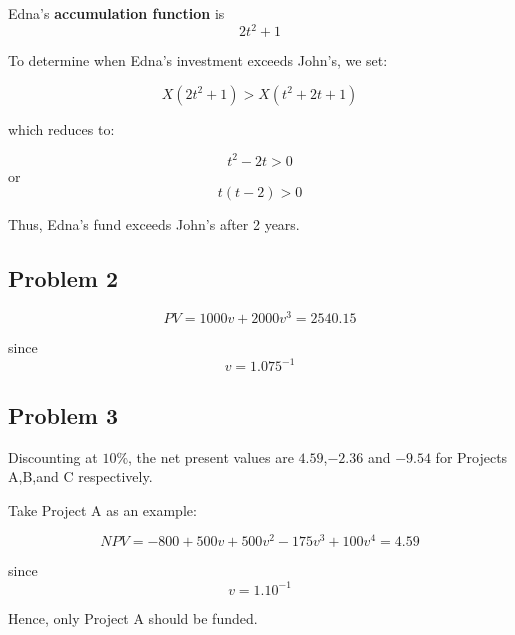 \documentclass[
]{book}
\begin{document}
Edna's \textbf{accumulation function} is \[2t^{2}+1\]

To determine when Edna's investment exceeds John's, we set:

\[ X(2t^{2}+1)>X(t^{2}+2t+1)\]

which reduces to:

\[t^{2}-2t>0\] or \[t(t-2)>0\]

Thus, Edna's fund exceeds John's after 2 years.

\hypertarget{problem-2}{%
\subsection*{Problem 2}\label{problem-2}}

\[PV=1000v+2000v^{3}=2540.15 \]

since \[v=1.075^{-1}\]

\hypertarget{problem-3}{%
\subsection*{Problem 3}\label{problem-3}}

Discounting at \(10\%\), the net present values are \(4.59\),\(-2.36\) and \(-9.54\) for Projects A,B,and C respectively.

Take Project A as an example:

\[NPV=-800+500v+500v^{2}-175v^{3}+100v^{4}=4.59\]

since \[v=1.10^{-1}\]

Hence, only Project A should be funded.

  
\end{document}
